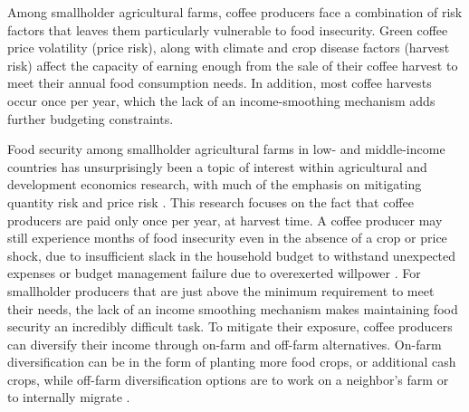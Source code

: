 \documentclass[../main.tex]{subfiles}
\begin{document}
Among smallholder agricultural farms, coffee producers face a combination of risk factors that leaves them particularly vulnerable to food insecurity. Green coffee price volatility (price risk), along with climate and crop disease factors (harvest risk) affect the capacity of earning enough from the sale of their coffee harvest to meet their annual food consumption needs. In addition, most coffee harvests occur once per year, which the lack of an income-smoothing mechanism adds further budgeting constraints. 

Food security among smallholder agricultural farms in low- and middle-income countries has unsurprisingly been a topic of interest within agricultural and development economics research, with much of the emphasis on mitigating quantity risk \parencite{karlan_agricultural_2014, mcintosh_utility_2019} and price risk \parencite{bellemare_welfare_2013, boyd_why_2022}. This research focuses on the fact that coffee producers are paid only once per year, at harvest time. A coffee producer may still experience months of food insecurity even in the absence of a crop or price shock, due to insufficient slack in the household budget to withstand unexpected expenses or budget management failure due to overexerted willpower \parencite{mani_poverty_2013}. For smallholder producers that are just above the minimum requirement to meet their needs, the lack of an income smoothing mechanism makes maintaining food security an incredibly difficult task. To mitigate their exposure, coffee producers can diversify their income through on-farm and off-farm alternatives. On-farm diversification can be in the form of planting more food crops, or additional cash crops, while off-farm diversification options are to work on a neighbor's farm or to internally migrate \parencite{bacon_explaining_2014}. 
\end{document}

